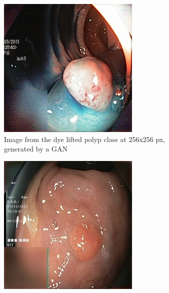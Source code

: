 \begin{figure}
\begin{subfigure}[t]{0.4\textwidth}
            \includegraphics[width=\textwidth]{experiments/figures/both/DLGAN.jpg}
            \caption{Image from the dye lifted polyp class at 256x256 px, generated by a GAN}    
            \label{fig:polypGAN}
        \end{subfigure}
        \qquad\vfill%
        \begin{subfigure}[t]{0.4\textwidth}   
            \centering 
            \includegraphics[width=\textwidth]{experiments/figures/both/greenAE.jpg}

\end{subfigure}
\end{figure}
